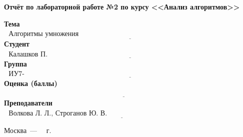 \begin{titlepage}
	\begin{center}
		\Large\textbf{Отчёт по лабораторной работе №2 по курсу <<Анализ алгоритмов>>}
	\end{center}


	\noindent\textbf{Тема} $\underline{\text{~~Алгоритмы умножения матриц~~~~~~~~~~~~~~~~~~~~~~~~~~~~~~~~~~~~~~~~~~~~~~~~~~~~~~~~~~~~~~~~~~~~~~~~~~}}$\newline\newline
	\noindent\textbf{Студент} $\underline{\text{~~Калашков П. А.~~~~~~~~~~~~~~~~~~~~~~~~~~~~~~~~~~~~~~~~~~~~~~~~~~~~~~~~~~~~~~~~~~~~~~~~~~~~~~~~~~~~~~~~~~}}$\newline\newline
	\noindent\textbf{Группа} $\underline{\text{~~ИУ7-56Б~~~~~~~~~~~~~~~~~~~~~~~~~~~~~~~~~~~~~~~~~~~~~~~~~~~~~~~~~~~~~~~~~~~~~~~~~~~~~~~~~~~~~~~~~~~~~~~~~~~~~~}}$\newline\newline
	\noindent\textbf{Оценка (баллы)} $\underline{\text{~~~~~~~~~~~~~~~~~~~~~~~~~~~~~~~~~~~~~~~~~~~~~~~~~~~~~~~~~~~~~~~~~~~~~~~~~~~~~~~~~~~~~~~~~~~~~~~~~~~~~~~}}$\newline\newline
	\noindent\textbf{Преподаватели} $\underline{\text{~~Волкова Л. Л., Строганов Ю. В.~~~~~~~~~~~~~~~~~~~~~~~~~~~~~~~~~~~~~~~~~~~~~~~~~~~~~~~~~}}$\newline

	\begin{center}
		\vfill
		Москва~---~\the\year
		~г.
	\end{center}
	\restoregeometry
\end{titlepage}

